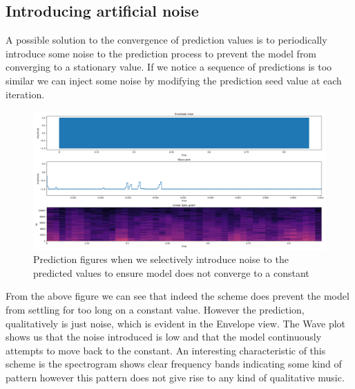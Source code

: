 \documentclass{article}
\begin{document}
\subsection{Introducing artificial noise}
A possible solution to the convergence of prediction values is to periodically introduce some noise to the prediction process to prevent the model from converging to a stationary value. If we notice a sequence of predictions is too similar we can inject some noise by modifying the prediction seed value at each iteration. 
\begin{figure}[H]
\caption{Prediction figures when we selectively introduce noise to the predicted values to ensure model does not converge to a constant}
\includegraphics[scale=0.35]{introduction_of_noise.png}
\end{figure}
From the above figure we can see that indeed the scheme does prevent the model from settling for too long on a constant value. However the prediction, qualitatively is just noise, which is evident in the Envelope view. The Wave plot shows us that the noise introduced is low and that the model continuously attempts to move back to the constant. An interesting characteristic of this scheme is the spectrogram shows clear frequency bands indicating some kind of pattern however this pattern does not give rise to any kind of qualitative music. 
\end{document}
